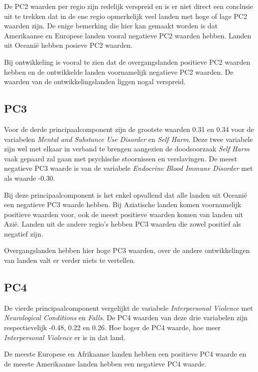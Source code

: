\documentclass[a4paper,kulak]{kulakarticle}
\begin{document}
De PC2 waarden per regio zijn redelijk verspreid en is er niet direct een conclusie uit te trekken dat in de ene regio opmerkelijk veel landen met hoge of lage PC2 waarden zijn. De enige bemerking die hier kan gemaakt worden is dat Amerikaanse en Europese landen vooral negatieve PC2 waarden hebben. Landen uit Oceani\"e hebben posieve PC2 waarden. 

Bij ontwikkeling is vooral te zien dat de overgangslanden positieve PC2 waarden hebben en de ontwikkelde landen voornamelijk negatieve PC2 waarden. De waarden van de ontwikkelingslanden liggen nogal verspreid.






\subsection{PC3}
Voor de derde principaalcomponent zijn de grootste waarden 0.31 en 0.34 voor de variabelen \textit{Mental and Substance Use Disorder} en \textit{Self Harm}. Deze twee variabele zijn wel met elkaar in verband te brengen aangezien de doodsoorzaak \textit{Self Harm} vaak gepaard zal gaan met psychische stoornissen en verslavingen. De meest negatieve PC3 waarde is van de variabele \textit{Endocrine Blood Immune Disorder} met als waarde -0.30.

Bij deze principaalcomponent is het enkel opvallend dat alle landen uit Oceani\"e een negatieve PC3 waarde hebben. Bij Aziatische landen komen voornamelijk positieve waarden voor, ook de meest positieve waarden komen van landen uit Azi\"e. Landen uit de andere regio's hebben PC3 waarden die zowel positief als negatief zijn. 


Overgangslanden hebben hier hoge PC3 waarden, over de andere ontwikkelingen van landen valt er verder niets te vertellen.


\subsection{PC4}
De vierde principaalcomponent vergelijkt de variabele \textit{Interpersonal Violence} met \textit{Neurological Conditions} en \textit{Falls}. De PC4 waarden van deze drie variabelen zijn respectievelijk -0.48, 0.22 en 0.26. Hoe hoger de PC4 waarde, hoe meer \textit{Interpersonal Violence} er is in dat land. 


De meeste Europese en Afrikaanse landen hebben een positieve PC4 waarde en de meeste Amerikaanse landen hebben een negatieve PC4 waarde. 
\end{document}
